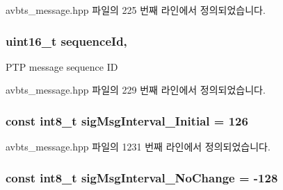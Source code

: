avbts\+\_\+message.\+hpp 파일의 225 번째 라인에서 정의되었습니다.

\subsubsection[{\texorpdfstring{sequence\+Id}{sequenceId}}]{\setlength{\rightskip}{0pt plus 5cm}uint16\+\_\+t sequence\+Id\hspace{0.3cm}{\ttfamily [protected]}, {\ttfamily [inherited]}}\hypertarget{class_p_t_p_message_common_a189710d5cff10c03f77d72a276a5f58e}{}\label{class_p_t_p_message_common_a189710d5cff10c03f77d72a276a5f58e}
P\+TP message sequence ID 

avbts\+\_\+message.\+hpp 파일의 229 번째 라인에서 정의되었습니다.

\subsubsection[{\texorpdfstring{sig\+Msg\+Interval\+\_\+\+Initial}{sigMsgInterval_Initial}}]{\setlength{\rightskip}{0pt plus 5cm}const int8\+\_\+t sig\+Msg\+Interval\+\_\+\+Initial = 126\hspace{0.3cm}{\ttfamily [static]}}\hypertarget{class_p_t_p_message_signalling_aa46796faa0e40d6a5c22d0c2ba50d991}{}\label{class_p_t_p_message_signalling_aa46796faa0e40d6a5c22d0c2ba50d991}


avbts\+\_\+message.\+hpp 파일의 1231 번째 라인에서 정의되었습니다.

\subsubsection[{\texorpdfstring{sig\+Msg\+Interval\+\_\+\+No\+Change}{sigMsgInterval_NoChange}}]{\setlength{\rightskip}{0pt plus 5cm}const int8\+\_\+t sig\+Msg\+Interval\+\_\+\+No\+Change = -\/128\hspace{0.3cm}{\ttfamily [static]}}\hypertarget{class_p_t_p_message_signalling_af6d2439496842acecd33cf27e79e8a04}{}\label{class_p_t_p_message_signalling_af6d2439496842acecd33cf27e79e8a04}


